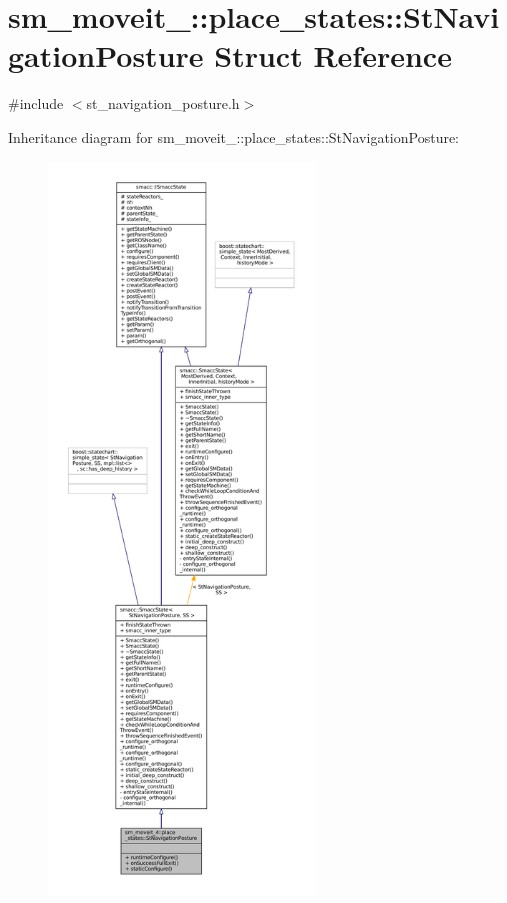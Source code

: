 \hypertarget{structsm__moveit__4_1_1place__states_1_1StNavigationPosture}{}\section{sm\+\_\+moveit\+\_\+:\+:place\+\_\+states\+:\+:St\+Navigation\+Posture Struct Reference}
\label{structsm__moveit__4_1_1place__states_1_1StNavigationPosture}


{\ttfamily \#include $<$st\+\_\+navigation\+\_\+posture.\+h$>$}



Inheritance diagram for sm\+\_\+moveit\+\_\+:\+:place\+\_\+states\+:\+:St\+Navigation\+Posture\+:
\nopagebreak
\begin{figure}[H]
\begin{center}
\leavevmode
\includegraphics[height=550pt]{structsm__moveit__4_1_1place__states_1_1StNavigationPosture__inherit__graph}
\end{center}
\end{figure}



